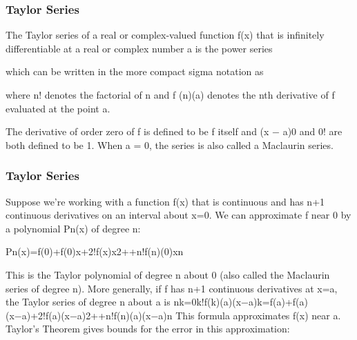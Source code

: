 

\begin{frame}
\frametitle{Taylor Series}
\Large
The Taylor series of a real or complex-valued function ƒ(x) that is infinitely differentiable at a real or complex number a is the power series
 
which can be written in the more compact sigma notation as
 
where n! denotes the factorial of n and ƒ (n)(a) denotes the nth derivative of ƒ evaluated at the point a. 

The derivative of order zero of ƒ is defined to be ƒ itself and (x − a)0 and 0! are both defined to be 1. When a = 0, the series is also called a Maclaurin series.

\end{frame}
\begin{frame}
\frametitle{Taylor Series}
\Large
Suppose we're working with a function f(x) that is continuous and has n+1 continuous derivatives on an interval about x=0. We can approximate f near 0 by a polynomial Pn(x) of degree n:

\end{frame}
\begin{frame}
Pn(x)=f(0)+f(0)x+2!f(x)x2++n!f(n)(0)xn

This is the Taylor polynomial of degree n about 0 (also called the Maclaurin series of degree n). More generally, if f has n+1 continuous derivatives at x=a, the Taylor series of degree n about a is
nk=0k!f(k)(a)(x−a)k=f(a)+f(a)(x−a)+2!f(a)(x−a)2++n!f(n)(a)(x−a)n 
This formula approximates f(x) near a. Taylor's Theorem gives bounds for the error in this approximation:

\end{frame}
